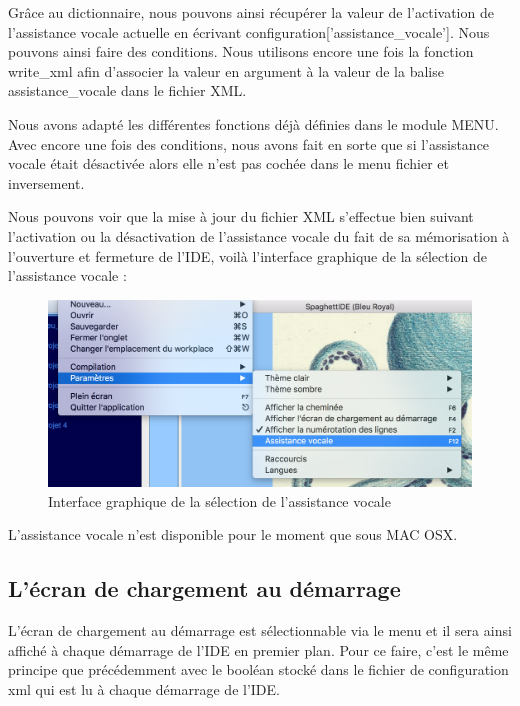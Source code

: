 \documentclass[a4paper,12pt]{article}
\begin{document}
Grâce au dictionnaire, nous pouvons ainsi récupérer la valeur de l'activation de l'assistance vocale actuelle en écrivant configuration['assistance\_vocale']. Nous pouvons ainsi faire des conditions. Nous utilisons encore une fois la fonction write\_xml afin d'associer la valeur en argument à la valeur de la balise assistance\_vocale dans le fichier XML. 

Nous avons adapté les différentes fonctions déjà définies dans le module MENU. Avec encore une fois des conditions, nous avons fait en sorte que si l'assistance vocale était désactivée alors elle n'est pas cochée dans le menu fichier et inversement.

Nous pouvons voir que la mise à jour du fichier XML s'effectue bien suivant l'activation ou la désactivation de l'assistance vocale du fait de sa mémorisation à l'ouverture et fermeture de l'IDE, voilà l'interface graphique de la sélection de l'assistance vocale : 

\newpage

\begin{figure}[h!]
			\begin{center}
				\includegraphics[scale=0.5]{images/assistance_vocale.png}
				\caption{Interface graphique de la sélection de l'assistance vocale}
			\end{center}
		\end{figure}
		
L'assistance vocale n'est disponible pour le moment que sous MAC OSX.
		
\subsection{L'écran de chargement au démarrage}

L'écran de chargement au démarrage est sélectionnable via le menu et il sera ainsi affiché à chaque démarrage de l'IDE en premier plan. Pour ce faire, c'est le même principe que précédemment avec le booléan stocké dans le fichier de configuration xml qui est lu à chaque démarrage de l'IDE. 
\end{document}
